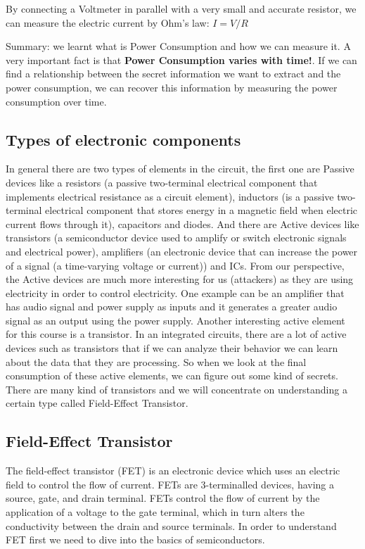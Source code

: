 By connecting a Voltmeter in parallel with a very small and accurate resistor, we can measure the
electric current by Ohm's law: $I=V/R$

Summary: we learnt what is Power Consumption and how we can measure it.
A very important fact is that \textbf{Power Consumption varies with time!}.
If we can find a relationship between the secret information we want to extract and
the power consumption, we can recover this information by measuring the power consumption over time.


\subsection{Types of electronic components}
In general there are two types of elements in the circuit, the first one are Passive devices like a resistors (a passive two-terminal electrical component that implements electrical resistance as a circuit element), inductors (is a passive two-terminal electrical component that stores energy in a magnetic field when electric current flows through it), capacitors and diodes. And there are Active devices like transistors (a semiconductor device used to amplify or switch electronic signals and electrical power), amplifiers (an electronic device that can increase the power of a signal (a time-varying voltage or current)) and ICs. From our perspective, the Active devices are much more interesting for us (attackers) as they are using electricity in order to control electricity. One example can be an amplifier that has audio signal and power supply as inputs and it generates a greater audio signal as an output using the power supply. 
Another interesting active element for this course is a transistor. In an integrated circuits, there are a lot of active devices such as transistors  that if we can analyze their behavior we can learn about the data that they are processing. So when we look at the final consumption of these active elements, we can figure out some kind of secrets.
There are many kind of transistors and we will concentrate on understanding a certain type called Field-Effect Transistor.

\subsection{ Field-Effect Transistor }
The field-effect transistor (FET) is an electronic device which uses an electric field to control the flow of current. FETs are 3-terminalled devices, having a source, gate, and drain terminal. FETs control the flow of current by the application of a voltage to the gate terminal, which in turn alters the conductivity between the drain and source terminals.
In order to understand FET first we need to dive into the basics of semiconductors.
